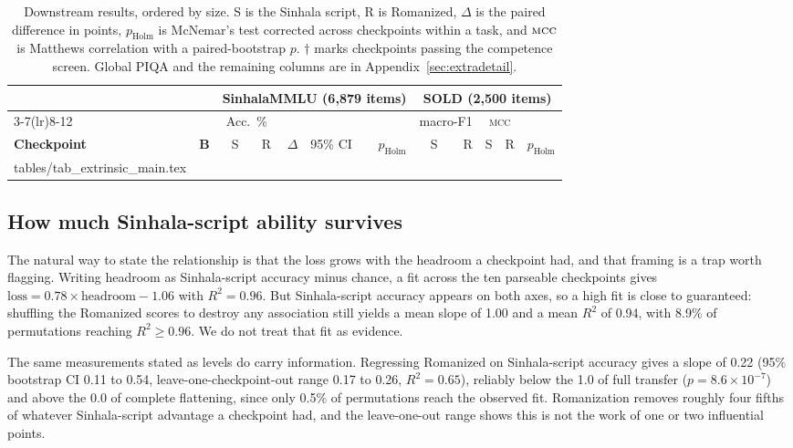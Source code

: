 \documentclass[11pt]{article}
\makeatletter
\newcommand{\mcc}{\textsc{mcc}}
\newcommand{\rows}[1]{\@@input #1 }
\makeatother
\begin{document}
\begin{table}[t]
\centering\footnotesize
\renewcommand{\arraystretch}{0.94}
\setlength{\tabcolsep}{4pt}
\begin{tabular}{@{}lr rrr l r rr rr r@{}}
\toprule
& & \multicolumn{5}{c}{\textbf{SinhalaMMLU} (6{,}879 items)}
& \multicolumn{5}{c}{\textbf{SOLD} (2{,}500 items)} \\
\cmidrule(lr){3-7}\cmidrule(lr){8-12}
& & \multicolumn{2}{c}{Acc.\ \%} & & &
& \multicolumn{2}{c}{macro-F1} & \multicolumn{2}{c}{\mcc} & \\
\textbf{Checkpoint} & \textbf{B} & S & R & $\Delta$ & 95\% CI & $p_{\text{Holm}}$
& S & R & S & R & $p_{\text{Holm}}$ \\
\midrule
\rows{tables/tab_extrinsic_main.tex}
\bottomrule
\end{tabular}
\caption{Downstream results, ordered by size. S is the Sinhala script, R is
Romanized, $\Delta$ is the paired difference in points, $p_{\text{Holm}}$ is
McNemar's test corrected across checkpoints within a task, and $\mcc$ is Matthews
correlation with a paired-bootstrap $p$. $\dagger$ marks checkpoints passing the
competence screen. Global PIQA and the remaining columns are in
Appendix~\ref{sec:extradetail}.}
\label{tab:main}
\end{table}

\subsection{How much Sinhala-script ability survives}
\label{sec:law}

The natural way to state the relationship is that the loss grows with the headroom a
checkpoint had, and that framing is a trap worth flagging. Writing headroom as
Sinhala-script accuracy minus chance, a fit across the ten parseable checkpoints
gives $\text{loss} = 0.78 \times \text{headroom} - 1.06$ with $R^2 = 0.96$. But
Sinhala-script accuracy appears on both axes, so a high fit is close to guaranteed:
shuffling the Romanized scores to destroy any association still yields a mean slope
of 1.00 and a mean $R^2$ of 0.94, with 8.9\% of permutations reaching
$R^2 \geq 0.96$. We do not treat that fit as evidence.

The same measurements stated as levels do carry information. Regressing Romanized
on Sinhala-script accuracy gives a slope of 0.22 (95\% bootstrap CI 0.11 to 0.54,
leave-one-checkpoint-out range 0.17 to 0.26, $R^2 = 0.65$), reliably below the 1.0
of full transfer ($p = 8.6 \times 10^{-7}$) and above the 0.0 of complete
flattening, since only 0.5\% of permutations reach the observed fit. Romanization
removes roughly four fifths of whatever Sinhala-script advantage a checkpoint had,
and the leave-one-out range shows this is not the work of one or two influential
points.
\end{document}
